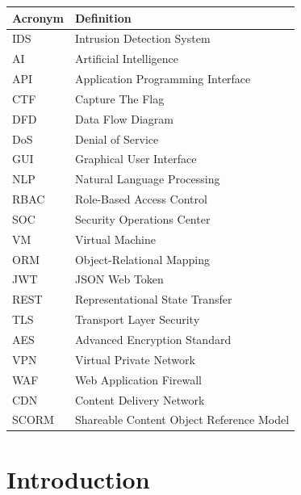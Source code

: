 \documentclass[12pt,a4paper]{report}
\newcommand{\hrow}{}
\newcommand{\hcell}[1]{\textbf{#1}}
\newcommand{\altrow}{}
\begin{document}
\begin{center}
\begin{tabular}{|L{2.8cm}|L{11.2cm}|}
\hline
\hrow \hcell{Acronym} & \hcell{Definition} \\
\hline
IDS  & Intrusion Detection System \\\hline
\altrow AI   & Artificial Intelligence \\\hline
API  & Application Programming Interface \\\hline
\altrow CTF  & Capture The Flag \\\hline
DFD  & Data Flow Diagram \\\hline
\altrow DoS  & Denial of Service \\\hline
GUI  & Graphical User Interface \\\hline
\altrow NLP  & Natural Language Processing \\\hline
RBAC & Role-Based Access Control \\\hline
\altrow SOC  & Security Operations Center \\\hline
VM   & Virtual Machine \\\hline
\altrow ORM  & Object-Relational Mapping \\\hline
JWT  & JSON Web Token \\\hline
\altrow REST & Representational State Transfer \\\hline
TLS  & Transport Layer Security \\\hline
\altrow AES  & Advanced Encryption Standard \\\hline
VPN  & Virtual Private Network \\\hline
\altrow WAF  & Web Application Firewall \\\hline
CDN  & Content Delivery Network \\\hline
\altrow SCORM& Shareable Content Object Reference Model \\\hline
\end{tabular}
\end{center}
\clearpage


\cleardoublepage
\hypersetup{pageanchor=true}
\chapter{Introduction}
\end{document}

